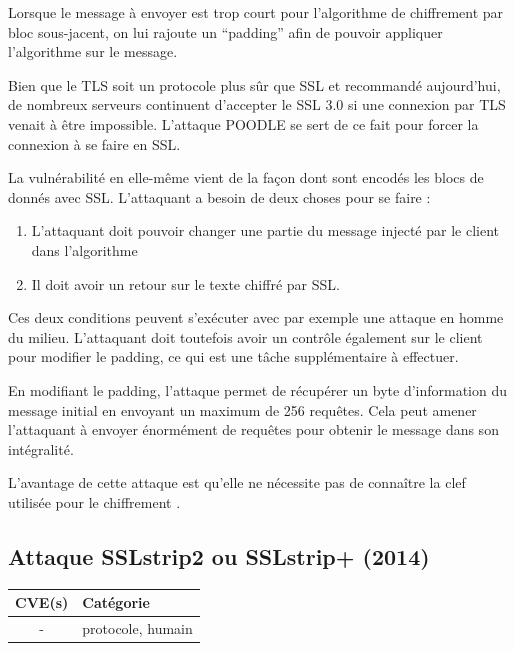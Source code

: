 Lorsque le message à envoyer est trop court pour l'algorithme de chiffrement par bloc sous-jacent, on lui rajoute un ``padding'' afin de pouvoir appliquer l'algorithme sur le message.

Bien que le TLS soit un protocole plus sûr que SSL et recommandé aujourd'hui, de nombreux serveurs continuent d'accepter le SSL 3.0 si une connexion par TLS venait à être impossible. L'attaque POODLE se sert de ce fait pour forcer la connexion à se faire en SSL.

La vulnérabilité en elle-même vient de la façon dont sont encodés les blocs de donnés avec SSL. L'attaquant a besoin de deux choses pour se faire :

\begin{enumerate}
    \item L'attaquant doit pouvoir changer une partie du message injecté par le client dans l'algorithme
    \item Il doit avoir un retour sur le texte chiffré par SSL.
\end{enumerate}

Ces deux conditions peuvent s'exécuter avec par exemple une attaque en homme du milieu. L'attaquant doit toutefois avoir un contrôle également sur le client pour modifier le padding, ce qui est une tâche supplémentaire à effectuer.

En modifiant le padding, l'attaque permet de récupérer un byte d'information du message initial en envoyant un maximum de 256 requêtes. Cela peut amener l'attaquant à envoyer énormément de requêtes pour obtenir le message dans son intégralité.

L'avantage de cette attaque est qu'elle ne nécessite pas de connaître la clef utilisée pour le chiffrement \cite{poodle}.



\subsection{Attaque SSLstrip2 ou SSLstrip+ (2014)}

\begin{tabularx}{0.96\textwidth}{|c|X|}
  \hline
  \textbf{CVE(s)} & \textbf{Catégorie} \\
  \hline
  - & protocole, humain \\
  \hline
\end{tabularx}

